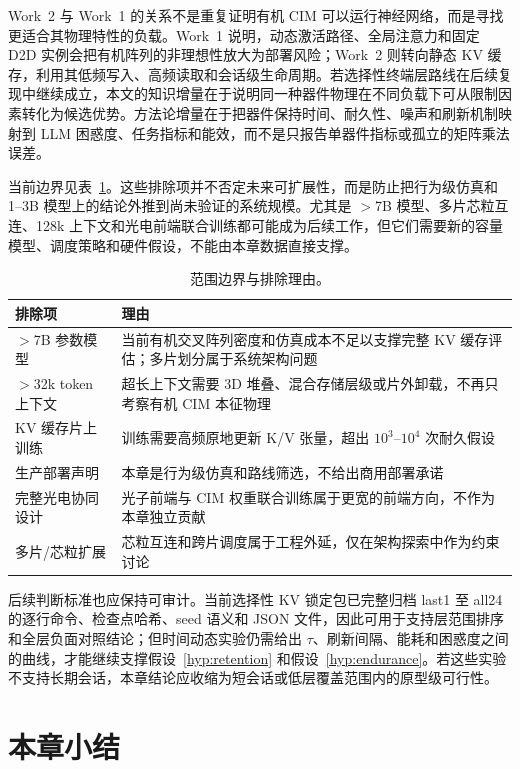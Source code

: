 Work~2 与 Work~1 的关系不是重复证明有机 CIM 可以运行神经网络，而是寻找更适合其物理特性的负载。Work~1 说明，动态激活路径、全局注意力和固定 D2D 实例会把有机阵列的非理想性放大为部署风险；Work~2 则转向静态 KV 缓存，利用其低频写入、高频读取和会话级生命周期。若选择性终端层路线在后续复现中继续成立，本文的知识增量在于说明同一种器件物理在不同负载下可从限制因素转化为候选优势。方法论增量在于把器件保持时间、耐久性、噪声和刷新机制映射到 LLM 困惑度、任务指标和能效，而不是只报告单器件指标或孤立的矩阵乘法误差。

当前边界见表~\ref{tab:boundaries}。这些排除项并不否定未来可扩展性，而是防止把行为级仿真和 1--3B 模型上的结论外推到尚未验证的系统规模。尤其是 $>$7B 模型、多片芯粒互连、128k 上下文和光电前端联合训练都可能成为后续工作，但它们需要新的容量模型、调度策略和硬件假设，不能由本章数据直接支撑。

\begin{table}[!htbp]
\centering
\caption{范围边界与排除理由。}
\label{tab:boundaries}
\small
\begin{tabularx}{\textwidth}{@{}l>{\raggedright\arraybackslash}X@{}}
\toprule
排除项 & 理由 \\
\midrule
$>$7B 参数模型 & 当前有机交叉阵列密度和仿真成本不足以支撑完整 KV 缓存评估；多片划分属于系统架构问题 \\
$>$32k token 上下文 & 超长上下文需要 3D 堆叠、混合存储层级或片外卸载，不再只考察有机 CIM 本征物理 \\
KV 缓存片上训练 & 训练需要高频原地更新 K/V 张量，超出 $10^3$--$10^4$ 次耐久假设 \\
生产部署声明 & 本章是行为级仿真和路线筛选，不给出商用部署承诺 \\
完整光电协同设计 & 光子前端与 CIM 权重联合训练属于更宽的前端方向，不作为本章独立贡献 \\
多片/芯粒扩展 & 芯粒互连和跨片调度属于工程外延，仅在架构探索中作为约束讨论 \\
\bottomrule
\end{tabularx}
\end{table}

后续判断标准也应保持可审计。当前选择性 KV 锁定包已完整归档 last1 至 all24 的逐行命令、检查点哈希、seed 语义和 JSON 文件，因此可用于支持层范围排序和全层负面对照结论；但时间动态实验仍需给出 $\tau$、刷新间隔、能耗和困惑度之间的曲线，才能继续支撑假设~\ref{hyp:retention} 和假设~\ref{hyp:endurance}。若这些实验不支持长期会话，本章结论应收缩为短会话或低层覆盖范围内的原型级可行性。

\FloatBarrier

\section{本章小结}
\label{sec:work2_summary}

